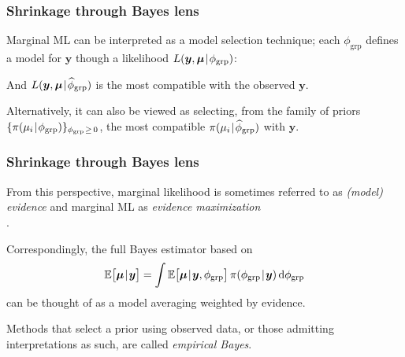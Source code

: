 \documentclass[18pt]{beamer}
\newcommand{\defineTightSpacing}{%
	\setlength{\abovedisplayskip}{.25\baselineskip}%
	\setlength{\belowdisplayskip}{.25\baselineskip}%
}
\renewcommand{\textsc}[1]{{\small \MakeUppercase{#1}}}
\newcommand{\given}{\thinnerspace | \thinnerspace}
\newcommand{\diff}{\operatorname{\mathrm{d}}\!{}}
\newcommand{\thinnerspace}{\mskip.5\thinmuskip}
\newcommand{\expectation}{\mathbb{E}}
\newcommand{\density}{\operatorname{\pi}}
\newcommand{\likelihood}{L}
\newcommand{\by}{\bm{y}}
\newcommand{\bmu}{\bm{\mu}}
\begin{document}
\begin{frame}
\frametitle{Shrinkage through Bayes lens}
Marginal {\small ML} can be interpreted as a model selection technique;
each $\phi_{\mathrm{grp}}$ defines a model for $\by$ though a likelihood $\likelihood(\by, \bmu \given \phi_{\mathrm{grp}})$:
\vspace*{-.4\baselineskip}
\begin{figure} 
\end{figure}
\vspace*{-.7\baselineskip}

\pause
And $\likelihood(\by, \bmu \given \widehat{\phi}_{\mathrm{grp}})$ is the most compatible with the observed $\by$.

\pause
\smallskip
Alternatively, it can also be viewed as selecting, from the family of priors $\{ \density(\mu_i \given \phi_{\mathrm{grp}}) \}_{ \phi_{\mathrm{grp}} \thinnerspace \geq \, 0 } $, the most compatible $\density(\mu_i \given \widehat{\phi}_{\mathrm{grp}})$ with $\by$.
\end{frame}

\begin{frame}
\frametitle{Shrinkage through Bayes lens}

From this perspective, marginal likelihood is sometimes referred to as \textit{(model) evidence} and marginal \textsc{ML} as \textit{evidence maximization}\\
\hfill \citep{mackay1992bayesian_model_comparison}.%

\pause
Correspondingly, the full Bayes estimator based on
\begin{equation*} \defineTightSpacing%
\expectation\big[
	\bmu \given \by
\big]
	= \int \expectation\big[
		\bmu \given \by, \phi_{\mathrm{grp}}
	\big] \density(\phi_{\mathrm{grp}} \given \by) \diff \phi_{\mathrm{grp}}
\end{equation*}
can be thought of as a model averaging weighted by evidence.

\pause
\smallskip
Methods that select a prior using observed data, or those admitting interpretations as such, are called \textit{empirical Bayes}.
\end{frame}
\end{document}
